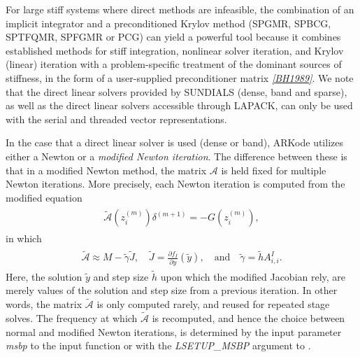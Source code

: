 \documentclass[letterpaper,10pt,english]{sphinxmanual}
\begin{document}
For large stiff systems where direct methods are infeasible, the
combination of an implicit integrator and a preconditioned
Krylov method (SPGMR, SPBCG, SPTFQMR, SPFGMR or PCG) can yield a
powerful tool because it combines established methods for stiff
integration, nonlinear solver iteration, and Krylov (linear) iteration
with a problem-specific treatment of the dominant sources of
stiffness, in the form of a user-supplied preconditioner matrix
\label{Mathematics:id5}{\hyperref[References:bh1989]{\emph{{[}BH1989{]}}}}.  We note that the direct linear solvers
provided by SUNDIALS (dense, band and sparse), as well as the direct
linear solvers accessible through LAPACK, can only be used with the
serial and threaded vector representations.

In the case that a direct linear solver is used (dense or band),
ARKode utilizes either a Newton or a \emph{modified Newton iteration}.  The
difference between these is that in a modified Newton method, the
matrix \({\mathcal A}\) is held fixed for multiple Newton
iterations.  More precisely, each Newton iteration is computed from
the modified equation
\label{Mathematics:equation-modified_Newton_system}\begin{gather}
\begin{split}\tilde{\mathcal A}\left(z_i^{(m)}\right) \delta^{(m+1)} = -G\left(z_i^{(m)}\right),\end{split}\label{Mathematics-modified_Newton_system}
\end{gather}
in which
\label{Mathematics:equation-modified_NewtonMatrix}\begin{gather}
\begin{split}\tilde{\mathcal A} \approx M - \tilde{\gamma} \tilde{J}, \quad \tilde{J} =
\frac{\partial f_I}{\partial y}(\tilde y), \quad\text{and}\quad
\tilde{\gamma} = \tilde{h} A^I_{i,i}.\end{split}\label{Mathematics-modified_NewtonMatrix}
\end{gather}
Here, the solution \(\tilde{y}\) and step size \(\tilde{h}\)
upon which the modified Jacobian rely, are merely values of the
solution and step size from a previous iteration.  In other words, the
matrix \(\tilde{\mathcal A}\) is only computed rarely, and reused for
repeated stage solves.  The frequency at which  \(\tilde{\mathcal
A}\) is recomputed, and hence the choice between normal and modified
Newton iterations, is determined by the input parameter \emph{msbp} to the
input function {\hyperref[c_interface/User_callable:c.ARKodeSetMaxStepsBetweenLSet]{\emph{}}} or with the
\emph{LSETUP\_MSBP} argument to {\hyperref[f_interface/Usage:f/_/FARKSETIIN]{\emph{}}}.
\end{document}
